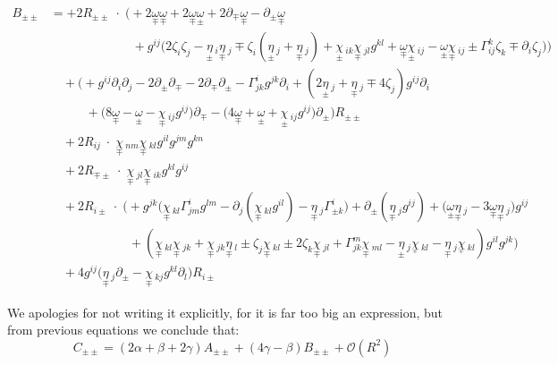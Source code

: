 \documentclass[a4paper,11pt]{article}
\begin{document}
\begin{align*}
    B_{\pm\pm} &= 
    + 2 R_{\pm\pm} \; \cdot \; \Big(
    + 2 \underset{\mp}{\omega}\underset{\mp}{\omega}
    + 2 \underset{\mp}{\omega} \underset{\pm}{\omega}
    +2 \partial_\mp\underset{\mp}{\omega} 
    - \partial_\pm \underset{\mp}{\omega}\\
     &\quad \quad \quad \quad \quad \quad \; \;
    + g^{ij} \big(2 \zeta_i \zeta_j
    - \underset{\pm}{\eta}\,_{i} \underset{\mp}{\eta}\,_{ j}
    \mp  \zeta_i(\underset{\pm}{\eta}\,_{ j}+\underset{\mp}{\eta}\,_j)
    + \underset{\pm}{\chi}\,_{ik} \underset{\mp}{\chi}\,_{jl}g^{kl}
    + \underset{\mp}{\omega} \underset{\pm}{\chi}\,_{ij}
    - \underset{\pm}{\omega} \underset{\mp}{\chi}\,_{ij}
    \pm \Gamma_{ij}^k \zeta_k 
    \mp \partial_i\zeta_j \big)
    \Big)\\
    &\quad 
    +  \Big(
    + g^{ij}\partial_i \partial_j
    -2 \partial_\pm\partial_\mp
    -2 \partial_\mp \partial_\pm
    -\Gamma_{jk}^i g^{jk}\partial_i
    + (2\underset{\pm}{\eta}\,_{ j} + \underset{\mp}{\eta}\,_j \mp 4 \zeta_j) g^{ij}\partial_i\\
    &\quad \quad \;\;\;
    +\big(8 \underset{\mp}{\omega}
    -\underset{\pm}{\omega} 
    -\underset{\mp}{\chi}\,_{ij} g^{ij}\big)\partial_\mp
    -\big(4 \underset{\mp}{\omega}
    +\underset{\pm}{\omega}
    +\underset{\pm}{\chi}\,_{ij} g^{ij} \big)\partial_\pm
    \Big) R_{\pm\pm}\\
    &\quad 
    + 2 R_{ij} \; \cdot \; \underset{\mp}{\chi}\,_{nm} \underset{\mp}{\chi}\,_{kl}g^{il}g^{jm}g^{kn}  \\
    &\quad 
    + 2 R_{\mp\pm} \; \cdot \; \underset{\mp}{\chi}\,_{jl} \underset{\mp}{\chi}\,_{ik} g^{kl} g^{ij} \\
    &\quad 
    + 2 R_{i\pm}  \; \cdot \;  \Big( + g^{jk}\big( \underset{\mp}{\chi}\,_{kl}\Gamma_{jm}^i g^{lm}
     -  \partial_j(\underset{\mp}{\chi}\,_{kl}g^{il})
    -  \underset{\mp}{\eta}\,_j \Gamma_{\pm k}^i\big)
    + \partial_\pm(\underset{\mp}{\eta}\,_j g^{ij})
    + \big(\underset{\pm}{\omega} \underset{\mp}{\eta}\,_j 
    -3 \underset{\mp}{\omega} \underset{\mp}{\eta}\,_j \big)g^{ij}\\
    &\quad \quad \quad \quad \quad \quad \;
     +  (\underset{\mp}{\chi}\,_{kl} \underset{\mp}{\chi}\,_{jk}
     +  \underset{\mp}{\chi}\,_{jk} \underset{\mp}{\eta}\,_l
     \pm  \zeta_j \underset{\mp}{\chi}\,_{kl}
     \pm  2 \zeta_k \underset{\mp}{\chi}\,_{jl}
     +  \Gamma_{jk}^m \underset{\mp}{\chi}\,_{ml}
     -  \underset{\pm}{\eta}\,_j\underset{_\mp}{\chi}\,_{kl}
     - \underset{\mp}{\eta}\,_j\underset{_\mp}{\chi}\,_{kl}
     )g^{il} g^{jk}\Big)\\
    &\quad 
    +4 g^{ij} \big( \underset{\mp}{\eta}\,_j \partial_\pm - \underset{\mp}{\chi}\,_{kj} g^{kl} \partial_l \big) R_{i \pm}
\end{align*}

We apologies for not writing it explicitly, for it is far too big an expression, but from \color{red} previous equations \color{black} we conclude that:
\begin{equation}
    \boxed{C_{\pm\pm} = (2\alpha + \beta + 2\gamma) A_{\pm\pm} +(4\gamma- \beta)B_{\pm\pm} + \mathcal{O}(R^2)}
\end{equation}
\end{document}
